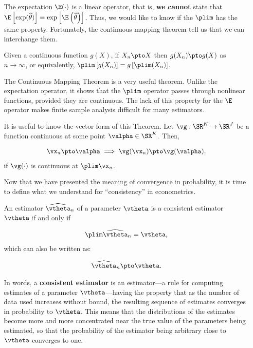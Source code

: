\documentclass[english,12pt]{book}\usepackage[]{graphicx}\usepackage[]{xcolor}
\begin{document}
The expectation $\E(\cdot)$ is a linear operator, that is, \textbf{we cannot} state that $\E\left[\exp(\widehat{\theta})\right] = \exp\left[\E\left(\widehat{\theta}\right)\right]$. Thus, we would like to know if the $\plim$ has the same property. Fortunately, the continuous mapping theorem tell us that we can interchange them. 

\begin{theorem}\label{teo:continuous_prob}
	Given a continuous function $g(X)$, if $X_n\pto X$ then $g(X_n)\pto g(X)$ as $n\to \infty$, or equivalently, $\plim \left[g(X_n)\right] = g\left[\plim (X_n)\right]$.
\end{theorem}

The Continuous Mapping Theorem is a very useful theorem. Unlike the expectation operator, it shows that the $\plim$ operator passes through nonlinear functions, provided they are continuous. The lack of this property for the $\E$ operator makes finite sample analysis difficult for many estimators. 


It is useful to know the vector form of this Theorem. Let $\vg:\SR^K\to\SR^J$ be a function continuous at some point $\valpha \in \SR^K$. Then, 

\begin{equation*}
  \vx_n \pto \valpha \implies \vg(\vx_n)\pto \vg(\valpha),
\end{equation*}
%
if $\vg(\cdot)$ is continuous at $\plim \vx_n$.


Now that we have presented the meaning of convergence in probability, it is time to define what we understand for ``consistency'' in econometrics.

\begin{definition}\label{def:consistent_est}
  An estimator $\widehat{\vtheta}_n$ of a parameter $\vtheta$ is a consistent estimator $\vtheta$ if and only if
  
  \begin{equation*}
    \plim \widehat{\vtheta}_n = \vtheta,
  \end{equation*}
%
which can also be written as:

  \begin{equation*}
    \widehat{\vtheta}_n \pto \vtheta.
  \end{equation*}
  
\end{definition}

In words, a \textbf{consistent estimator} is an estimator---a rule for computing estimates of a parameter $\vtheta$---having the property that as the number of data used increases without bound, the resulting sequence of estimates converges in probability to $\vtheta$. This means that the distributions of the estimates become more and more concentrated near the true value of the parameters being estimated, so that the probability of the estimator being arbitrary close to $\vtheta$ converges to one. 
\end{document}
